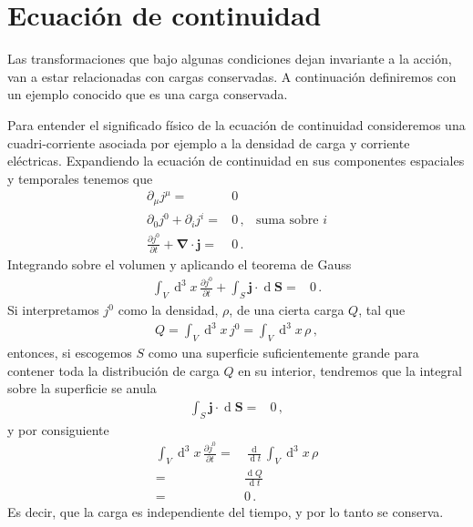 \section{Ecuación de continuidad}
\begin{frame}
Las transformaciones que bajo algunas condiciones dejan invariante a la acción, van a estar relacionadas con cargas conservadas. A continuación definiremos con un ejemplo conocido que es una carga conservada.

Para entender el significado físico de la ecuación de continuidad consideremos una cuadri-corriente asociada por ejemplo a la densidad de carga y corriente eléctricas. Expandiendo la ecuación de continuidad en sus componentes espaciales y temporales tenemos que
\begin{align}
  \partial_\mu j^\mu=&0&\nonumber\\
  \partial_0 j^0+ \partial_i j^i=&0\,,&\text{suma sobre $i$}\nonumber\\
  \frac{\partial j^0}{\partial t}+ \boldsymbol{\nabla}\cdot\boldsymbol{j}=&0\,.
\end{align}
Integrando sobre el volumen y aplicando el teorema de Gauss
\begin{align}
  \int_V \operatorname{d}^3x\,\frac{\partial j^0}{\partial t}
+\int_S \boldsymbol{j}\cdot \operatorname{d}  \boldsymbol{S}=&0\,.
\end{align}
Si interpretamos $j^0$ como la densidad, $\rho$, de una cierta carga $Q$, tal que
\begin{align}
  Q=\int_{V} \operatorname{d}^3x\, j^0= \int_{V} \operatorname{d}^3x\, \rho\,,
\end{align}
entonces, si escogemos $S$ como una superficie suficientemente grande para contener toda la distribución de carga $Q$ en su interior, tendremos que la integral sobre la superficie se anula
\begin{align}
  \int_S \boldsymbol{j}\cdot \operatorname{d} \boldsymbol{S}=&0\,,
\end{align}
y por consiguiente
\begin{align}
  \int_V \operatorname{d}^3x\,\frac{\partial j^0}{\partial t}=&
\frac{\operatorname{d}}{\operatorname{d}t}\int_V \operatorname{d}^3x\,\rho \nonumber\\
=&\frac{\operatorname{d}Q}{\operatorname{d}t}\nonumber\\
  =&0\,.
\end{align}
Es decir, que la carga es independiente del tiempo, y por lo tanto se conserva.
\end{frame}



